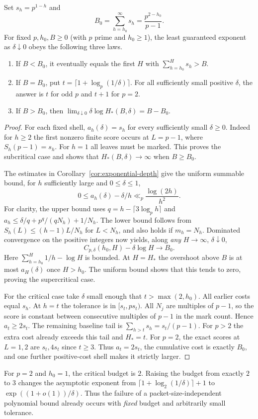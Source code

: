 \begin{theorem}\label{thm:transition}
Set $s_h=p^{1-h}$ and
\[
 B_0=\sum_{h=h_0}^\infty s_h=\frac{p^{2-h_0}}{p-1}.
\]
For fixed $p,h_0,B\ge0$ (with $p$ prime and $h_0\ge1$), the least guaranteed exponent as $\delta\downarrow0$ obeys the following three laws.
\begin{enumerate}
\item If $B<B_0$, it eventually equals the first $H$ with $\sum_{h=h_0}^H s_h>B$.
\item If $B=B_0$, put $t=\lceil1+\log_p(1/\delta)\rceil$. For all sufficiently small positive $\delta$, the answer is $t$ for odd $p$ and $t+1$ for $p=2$.
\item If $B>B_0$, then $\displaystyle\lim_{\delta\downarrow0}\delta\log H_*(B,\delta)=B-B_0$.
\end{enumerate}
\end{theorem}
\begin{proof}
For each fixed shell, $a_h(\delta)=s_h$ for every sufficiently small $\delta\ge0$. Indeed for $h\ge2$ the first nonzero finite score occurs at $L=p-1$, where $S_h(p-1)=s_h$. For $h=1$ all leaves must be marked. This proves the subcritical case and shows that $H_*(B,\delta)\to\infty$ when $B\ge B_0$.

The estimates in Corollary~\ref{cor:exponential-depth} give the uniform summable bound, for $h$ sufficiently large and $0\le\delta\le1$,
\[
 0\le a_h(\delta)-\delta/h
 \ll_p \frac{\log(2h)}{h^2}.
\]
For clarity, the upper bound uses $q=h-\lceil3\log_p h\rceil$ and
$a_h\le \delta/q +p^q/(qN_h)+1/N_h$. The lower bound follows from $S_h(L)\le(h-1)L/N_h$ for $L<N_h$, and also holds if $m_h=N_h$. Dominated convergence on the positive integers now yields, along \emph{any} $H\to\infty$, $\delta\downarrow0$,
\[
 C_{p,\delta}(h_0,H)-\delta\log H\longrightarrow B_0.
\]
Here $\sum_{h=h_0}^H 1/h-\log H$ is bounded. At $H=H_*$ the overshoot above $B$ is at most $a_H(\delta)$ once $H>h_0$. The uniform bound shows that this tends to zero, proving the supercritical case.

For the critical case take $\delta$ small enough that $t>\max(2,h_0)$. All earlier costs equal $s_h$. At $h=t$ the tolerance is in $[s_t,p s_t)$. All $N_j$ are multiples of $p-1$, so the score is constant between consecutive multiples of $p-1$ in the mark count. Hence $a_t\ge2s_t$. The remaining baseline tail is $\sum_{h>t}s_h=s_t/(p-1)$. For $p>2$ the extra cost already exceeds this tail and $H_*=t$. For $p=2$, the exact scores at $L=1,2$ are $s_t,4s_t$ since $t\ge3$. Thus $a_t=2s_t$, the cumulative cost is exactly $B_0$, and one further positive-cost shell makes it strictly larger.
\end{proof}

For $p=2$ and $h_0=1$, the critical budget is $2$. Raising the budget from exactly $2$ to $3$ changes the asymptotic exponent from $\lceil1+\log_2(1/\delta)\rceil+1$ to $\exp((1+o(1))/\delta)$. Thus the failure of a packet-size-independent polynomial bound already occurs with \emph{fixed} budget and arbitrarily small tolerance.

